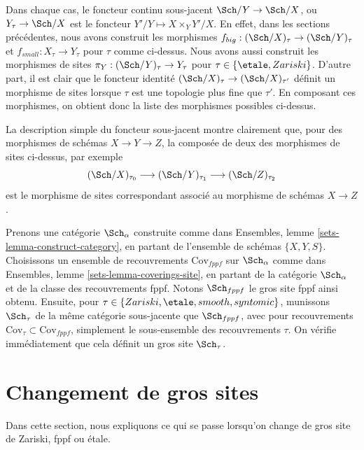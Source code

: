 Dans chaque cas, le foncteur continu sous-jacent
$\Sch/Y \to \Sch/X$, ou
$Y_\tau \to \Sch/X$
est le foncteur $Y'/Y \mapsto X \times_Y Y'/X$. En effet, dans les sections
précédentes, nous avons construit les morphismes
$f_{big} : (\Sch/X)_\tau \to (\Sch/Y)_\tau$
et
$f_{small} : X_\tau \to Y_\tau$
pour $\tau$ comme ci-dessus.
Nous avons aussi construit les morphismes de sites
$\pi_Y : (\Sch/Y)_\tau \to Y_\tau$ pour
$\tau \in \{\etale, Zariski\}$.
D'autre part, il est clair que le foncteur identité
$(\Sch/X)_\tau \to (\Sch/X)_{\tau'}$ définit
un morphisme de sites lorsque $\tau$ est une topologie plus fine que
$\tau'$. En composant ces morphismes, on obtient donc la liste des morphismes possibles
ci-dessus.

\medskip\noindent
La description simple du foncteur sous-jacent montre clairement que, pour des
morphismes de schémas $X \to Y \to Z$, la composée de deux des
morphismes de sites ci-dessus, par exemple
$$
(\Sch/X)_{\tau_0} \longrightarrow
(\Sch/Y)_{\tau_1} \longrightarrow
(\Sch/Z)_{\tau_2}
$$
est le morphisme de sites correspondant associé au morphisme de
schémas $X \to Z$.

\begin{remark}
\label{remark-choice-sites}
Prenons une catégorie $\Sch_\alpha$ construite comme dans
Ensembles, lemme \ref{sets-lemma-construct-category},
en partant de l'ensemble de schémas $\{X, Y, S\}$. Choisissons un ensemble de
recouvrements $\text{Cov}_{fppf}$ sur $\Sch_\alpha$ comme dans
Ensembles, lemme \ref{sets-lemma-coverings-site},
en partant de la catégorie $\Sch_\alpha$ et de la classe des recouvrements
fppf. Notons $\Sch_{fppf}$ le gros site fppf ainsi
obtenu. Ensuite, pour $\tau \in \{Zariski, \etale, smooth, syntomic\}$,
munissons $\Sch_\tau$ de la même catégorie sous-jacente que
$\Sch_{fppf}$, avec pour recouvrements
$\text{Cov}_\tau \subset \text{Cov}_{fppf}$, simplement le sous-ensemble des
recouvrements $\tau$. On vérifie immédiatement que cela définit
un gros site $\Sch_\tau$.
\end{remark}









\section{Changement de gros sites}
\label{section-change-alpha}

\noindent
Dans cette section, nous expliquons ce qui se passe lorsqu'on change de gros
site de Zariski, fppf ou étale.

